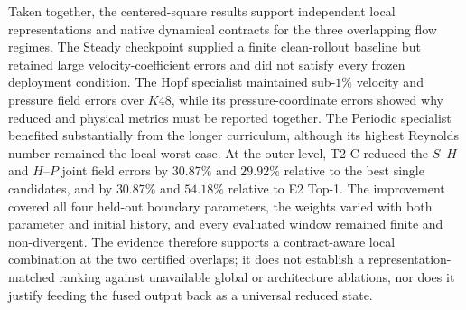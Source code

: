 Taken together, the centered-square results support independent local
representations and native dynamical contracts for the three overlapping
flow regimes.  The Steady checkpoint supplied a finite clean-rollout baseline
but retained large velocity-coefficient errors and did not satisfy every
frozen deployment condition.  The Hopf specialist maintained sub-$1\%$
velocity and pressure field errors over $K48$, while its pressure-coordinate
errors showed why reduced and physical metrics must be reported together.
The Periodic specialist benefited substantially from the longer curriculum,
although its highest Reynolds number remained the local worst case.  At the
outer level, T2-C reduced the $S$--$H$ and $H$--$P$ joint field errors by
$30.87\%$ and $29.92\%$ relative to the best single candidates, and by
$30.87\%$ and $54.18\%$ relative to E2 Top-1.  The improvement covered all
four held-out boundary parameters, the weights varied with both parameter
and initial history, and every evaluated window remained finite and
non-divergent.  The evidence therefore supports a contract-aware local
combination at the two certified overlaps; it does not establish a
representation-matched ranking against unavailable global or architecture
ablations, nor does it justify feeding the fused output back as a universal
reduced state.
